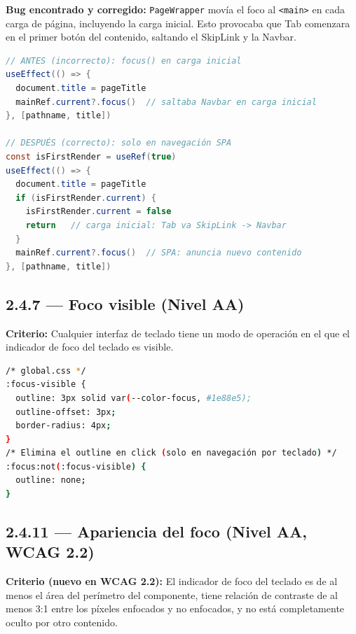 \documentclass[12pt, a4paper]{article}
\begin{document}
\textbf{Bug encontrado y corregido:} \texttt{PageWrapper} movía el foco al \texttt{<main>} en cada carga de página, incluyendo la carga inicial. Esto provocaba que Tab comenzara en el primer botón del contenido, saltando el SkipLink y la Navbar.

\begin{evidbox}
\begin{lstlisting}[language=Java]
// ANTES (incorrecto): focus() en carga inicial
useEffect(() => {
  document.title = pageTitle
  mainRef.current?.focus()  // saltaba Navbar en carga inicial
}, [pathname, title])

// DESPUÉS (correcto): solo en navegación SPA
const isFirstRender = useRef(true)
useEffect(() => {
  document.title = pageTitle
  if (isFirstRender.current) {
    isFirstRender.current = false
    return   // carga inicial: Tab va SkipLink -> Navbar
  }
  mainRef.current?.focus()  // SPA: anuncia nuevo contenido
}, [pathname, title])
\end{lstlisting}
\end{evidbox}

\subsection{2.4.7 --- Foco visible (Nivel AA)}

\textbf{Criterio:} Cualquier interfaz de teclado tiene un modo de operación en el que el indicador de foco del teclado es visible.

\begin{evidbox}
\begin{lstlisting}[language=bash]
/* global.css */
:focus-visible {
  outline: 3px solid var(--color-focus, #1e88e5);
  outline-offset: 3px;
  border-radius: 4px;
}
/* Elimina el outline en click (solo en navegación por teclado) */
:focus:not(:focus-visible) {
  outline: none;
}
\end{lstlisting}
\end{evidbox}

\subsection{2.4.11 --- Apariencia del foco (Nivel AA, WCAG 2.2)}

\textbf{Criterio (nuevo en WCAG 2.2):} El indicador de foco del teclado es de al menos el área del perímetro del componente, tiene relación de contraste de al menos 3:1 entre los píxeles enfocados y no enfocados, y no está completamente oculto por otro contenido.
\end{document}
